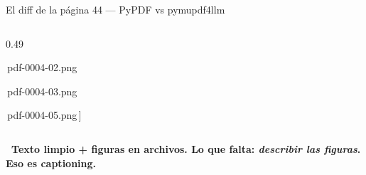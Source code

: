 \documentclass[aspectratio=169, 11pt]{beamer}
\begin{document}
\begin{frame}[shrink]{El diff de la página 44 --- PyPDF vs pymupdf4llm}
\begin{columns}[t]
\begin{column}{0.49\textwidth}
\begin{tcolorbox}
{{        \,pdf-0004-02.png\par
        \,pdf-0004-03.png\par
        \,pdf-0004-05.png\,]}}
      \end{tcolorbox}
    \end{column}
  \end{columns}
  \vspace{10pt}
  \begin{tcolorbox}[colback=arcaRed!8, colframe=arcaRed, leftrule=3pt,
    boxrule=0pt, sharp corners, left=8pt, right=8pt, top=3pt, bottom=3pt]
    {\footnotesize\color{arcaDark}\bfseries
    \faCheckSquare~Texto limpio + figuras en archivos.
    Lo que falta: \emph{describir las figuras}. Eso es captioning.}
  \end{tcolorbox}
\end{frame}
\end{document}
